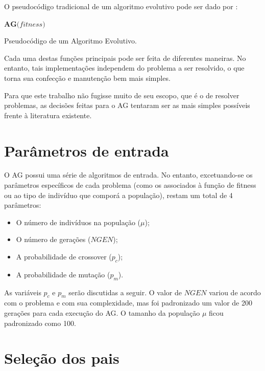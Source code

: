 \label{3_algoritmo_genetico}

O pseudocódigo tradicional de um algoritmo evolutivo pode ser dado por \cite{algoritmopseudo}:

\begin{algorithm}[H]
$\textbf{AG(} fitness \textbf{)}$
\caption{Pseudocódigo de um Algoritmo Evolutivo.}
\label{alg:ae}
\end{algorithm}

Cada uma destas funções principais pode ser feita de diferentes maneiras. No entanto, tais implementações independem do problema a ser resolvido, o que torna sua confecção e manutenção bem mais simples.

Para que este trabalho não fugisse muito de seu escopo, que é o de resolver problemas, as decisões feitas para o AG tentaram ser as mais simples possíveis frente à literatura existente.

\section{Parâmetros de entrada}

O AG possui uma série de algoritmos de entrada. No entanto, excetuando-se os parâmetros específicos de cada problema (como os associados à função de fitness ou ao tipo de indivíduo que comporá a população), restam um total de 4 parâmetros:

\begin{itemize}
	\item O número de indivíduos na população ($\mu$);
	\item O número de gerações ($NGEN$);
	\item A probabilidade de crossover ($p_c$);
	\item A probabilidade de mutação ($p_m$).
\end{itemize}

As variáveis $p_c$ e $p_m$ serão discutidas a seguir. O valor de $NGEN$ variou de acordo com o problema e com sua complexidade, mas foi padronizado um valor de 200 gerações para cada execução do AG. O tamanho da população $\mu$ ficou padronizado como 100.

\section{Seleção dos pais}

